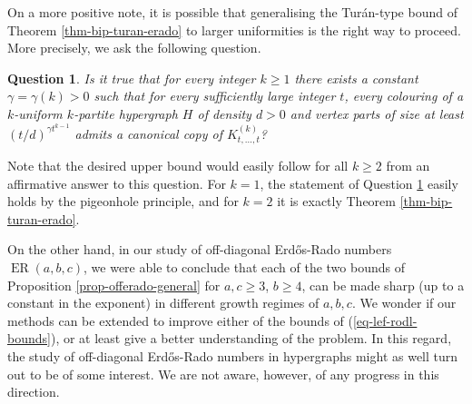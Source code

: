 \documentclass[11pt]{article}
\theoremstyle{plain}
\newtheorem{question}[theorem]{Question}
\theoremstyle{definition}
\newcommand{\offerado}[3]{\operatorname{ER}(#1,#2,#3)}
\newcommand{\cmpltt}[3]{K^{(#1)}_{#2,\dots,#3}}
\newcommand{\cmplt}[2]{\cmpltt{#1}{#2}{#2}}
\begin{document}
On a more positive note, it is possible that generalising the Tur\'an-type bound of Theorem \ref{thm-bip-turan-erado} to larger uniformities is the right way to proceed. More precisely, we ask the following question.

\begin{question}\label{qst-turan}
    Is it true that for every integer $k\ge 1$ there exists a constant $\gamma=\gamma(k)>0$ such that for every sufficiently large integer $t$, every colouring of a $k$-uniform $k$-partite hypergraph $H$ of density $d>0$ and vertex parts of size at least $(t/d)^{\gamma t^{k-1}}$ admits a canonical copy of $\cmplt{k}{t}$?
\end{question}

Note that the desired upper bound would easily follow for all $k\ge 2$ from an affirmative answer to this question. For $k=1$, the statement of Question \ref{qst-turan} easily holds by the pigeonhole principle, and for $k=2$ it is exactly Theorem \ref{thm-bip-turan-erado}.

On the other hand, in our study of off-diagonal Erd\H{o}s-Rado numbers $\offerado{a}{b}{c}$, we were able to conclude that each of the two bounds of Proposition \ref{prop-offerado-general} for $a,c\ge 3$, $b\ge4$, can be made sharp (up to a constant in the exponent) in different growth regimes of $a,b,c$. We wonder if our methods can be extended to improve either of the bounds of (\ref{eq-lef-rodl-bounds}), or at least give a better understanding of the problem. In this regard, the study of off-diagonal Erd\H{o}s-Rado numbers in hypergraphs might as well turn out to be of some interest. We are not aware, however, of any progress in this direction.
\end{document}
